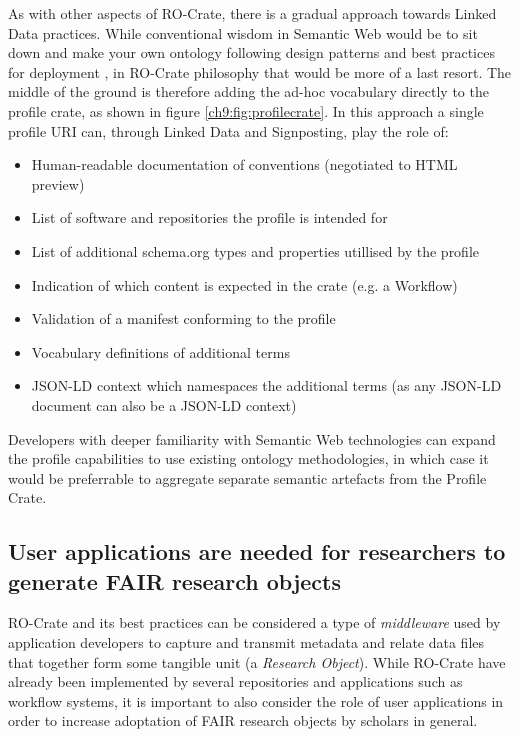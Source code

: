As with other aspects of RO-Crate, there is a gradual approach towards Linked Data practices. While conventional wisdom in Semantic Web would be to sit down and make your own ontology following design patterns \cite{Blomquist 2009,Poveda 2010} and best practices for deployment \cite{Matentzoglu 2022}, in RO-Crate philosophy that would be more of a last resort. The middle of the ground is therefore adding the ad-hoc vocabulary directly to the profile crate, as shown in figure \vref{ch9:fig:profilecrate}. In this approach a single profile URI can, through Linked Data and Signposting, play the role of:

\begin{itemize}
  \item Human-readable documentation of conventions (negotiated to HTML preview)
  \item List of software and repositories the profile is intended for
  \item List of additional schema.org types and properties utillised by the profile
  \item Indication of which content is expected in the crate (e.g. a Workflow)
  \item Validation of a manifest conforming to the profile
  \item Vocabulary definitions of additional terms
  \item JSON-LD context which namespaces the additional terms  (as any JSON-LD document can also be a JSON-LD context)
\end{itemize}

Developers with deeper familiarity with Semantic Web technologies can expand the profile capabilities to use existing ontology methodologies, in which case it would be preferrable to aggregate separate semantic artefacts from the Profile Crate.


\subsection{User applications are needed for researchers to generate FAIR research objects}

RO-Crate and its best practices can be considered a type of \emph{middleware} used by application developers to capture and transmit metadata and relate data files that together form some tangible unit (a \emph{Research Object}). While RO-Crate have already been implemented by several repositories and applications such as workflow systems, it is important to also consider the role of user applications in order to increase adoptation of FAIR research objects by scholars in general.

